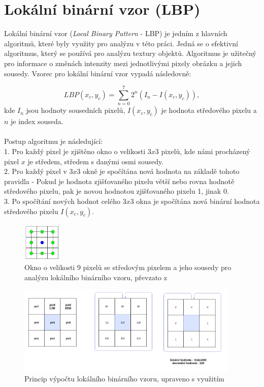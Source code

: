 \section{Lokální binární vzor (LBP)}
Lokální binární vzor (\textit{Local Binary Pattern} - LBP) je jedním z hlavních algoritmů, které byly využity pro analýzu v této práci. Jedná se o efektivní algoritmus, který se používá pro analýzu textury objektů.  Algoritmus je užitečný pro informace o změnách intenzity mezi jednotlivými pixely obrázku a jejich sousedy. Vzorec pro lokální binární vzor vypadá následovně: \cite{GaikwadStudy}

$$LBP(x_c,y_c) = \sum_{n=0}^{7}2^n(I_n-I(x_c,y_c)),$$
kde $I_n$ jsou hodnoty sousedních pixelů, $I(x_c,y_c)$ je hodnota středového pixelu a $n$ je index souseda.\\\\
Postup algoritmu je následující:\\
1. Pro každý pixel je zjištěno okno o velikosti $3x3$ pixelů, kde námi procházený pixel $x$ je středem, středem s danými osmi sousedy.\\
2. Pro každý pixel v $3x3$ okně je spočítána nová hodnota na základě tohoto pravidla - Pokud je hodnota zjišťovaného pixelu větší nebo rovna hodnotě středového pixelu, pak je novou hodnotou zjišťovaného pixelu 1, jinak 0.\\
3. Po spočítání nových hodnot celého $3x3$ okna je spočítána nová binární hodnota středového pixelu $I(x_c,y_c)$.\\

\begin{figure}[!htbp]
    \centering
    \includegraphics[width=70px]{obrazky-figures/lbpn.png}
    \caption{Okno o velikosti 9 pixelů se středovým pixelem a jeho sousedy pro analýzu lokálního binárního vzoru, převzato z \cite{GragnanielloStudy}}
\end{figure}

\begin{figure}[!htbp]
    \centering
    \includegraphics[width=400px]{obrazky-figures/lbpprincip.png}
    \caption{Princip výpočtu lokálního binárního vzoru, upraveno s využitím \cite{GaikwadStudy}}
\end{figure}

